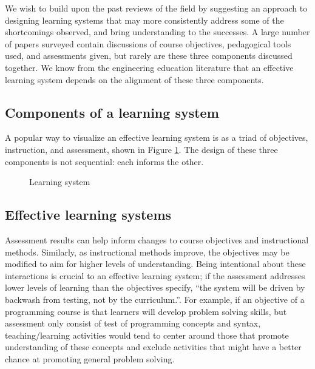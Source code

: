 \documentclass[12pt]{article}
\let\textcite=\autocite
\begin{document}
We wish to build upon the past reviews of the field by suggesting an
approach to designing learning systems that may more consistently
address some of the shortcomings observed, and bring understanding to
the successes. A large number of papers surveyed contain discussions
of course objectives, pedagogical tools used, and assessments given,
but rarely are these three components discussed together. We know from
the engineering education literature that an effective learning
system depends on the alignment of these three
components\autocite{jamieson_creating_2009,pellegrino_rethinking_2006}.

\subsection{Components of a learning
system}\label{sec:components-of-a-learning-system}

A popular way to visualize an effective learning system is as a triad
of objectives, instruction, and
assessment\textcite{felder_designing_2003}, shown in Figure
\ref{fig:learning-system}. The design of these three components is not
sequential: each informs the other.

\begin{figure}[h!]
  \centering
  \caption{Learning system}
  \label{fig:learning-system}
\end{figure}

\subsection{Effective learning systems}\label{sec:effective-learning-systems}

Assessment results can help inform changes to course objectives and
instructional methods\autocite{felder_designing_2003}. Similarly, as
instructional methods improve, the objectives may be modified to aim
for higher levels of understanding. Being intentional about these
interactions is crucial to an effective learning system; if the
assessment addresses lower levels of learning than the objectives
specify, ``the system will be driven by backwash from testing, not by
the curriculum.''\autocite[][p. 350]{biggs_enhancing_1996}. For
example, if an objective of a programming course is that learners will
develop problem solving skills, but assessment only consist of test of
programming concepts and syntax, teaching/learning activities would
tend to center around those that promote understanding of these
concepts and exclude activities that might have a better chance at
promoting general problem solving\autocite{biggs_enhancing_1996}.
\end{document}
